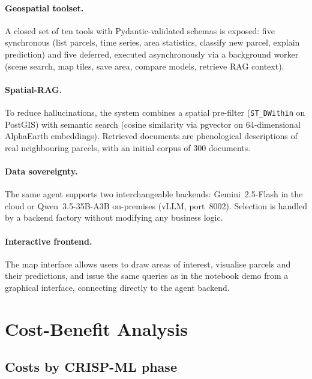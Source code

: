 \documentclass{article}
\begin{document}
\paragraph{Geospatial toolset.}
A closed set of ten tools with Pydantic-validated schemas is exposed:
five synchronous (list parcels, time series, area statistics, classify
new parcel, explain prediction) and five deferred, executed asynchronously
via a background worker (scene search, map tiles, save area, compare
models, retrieve RAG context).

\paragraph{Spatial-RAG.}
To reduce hallucinations, the system combines a spatial pre-filter
(\texttt{ST\_DWithin} on PostGIS) with semantic search (cosine similarity
via pgvector on 64-dimensional AlphaEarth embeddings). Retrieved documents
are phenological descriptions of real neighbouring parcels, with an
initial corpus of 300 documents.

\paragraph{Data sovereignty.}
The same agent supports two interchangeable backends: Gemini~2.5-Flash
in the cloud or Qwen~3.5-35B-A3B on-premises (vLLM, port~8002). Selection
is handled by a backend factory without modifying any business logic.

\paragraph{Interactive frontend.}
The map interface allows users to draw areas of interest, visualise
parcels and their predictions, and issue the same queries as in the
notebook demo from a graphical interface, connecting directly to the
agent backend.

\section{Cost-Benefit Analysis}

\subsection{Costs by CRISP-ML phase}
\end{document}
